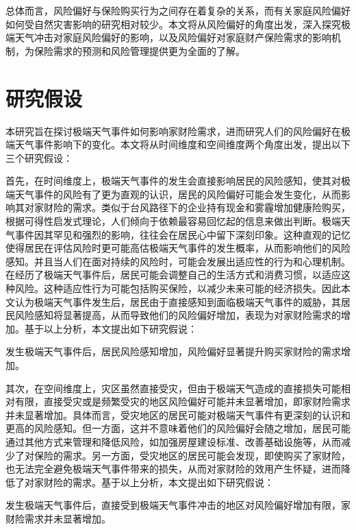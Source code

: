 总体而言，风险偏好与保险购买行为之间存在着复杂的关系，而有关家庭风险偏好如何受自然灾害影响的研究相对较少。本文将从风险偏好的角度出发，深入探究极端天气冲击对家庭风险偏好的影响，以及风险偏好对家庭财产保险需求的影响机制，为保险需求的预测和风险管理提供更为全面的了解。

\section{研究假设}

本研究旨在探讨极端天气事件如何影响家财险需求，进而研究人们的风险偏好在极端天气事件影响下的变化。本文将从时间维度和空间维度两个角度出发，提出以下三个研究假设：

首先，在时间维度上，极端天气事件的发生会直接影响居民的风险感知，使其对极端天气事件的风险有了更为直观的认识，居民的风险偏好可能会发生变化，从而影响其对家财险的需求。类似于台风路径下的企业持有现金\citep{0Do}和雾霾增加健康险购买\citep{赵强2021空气污染对商业健康保险需求的影响}，根据可得性启发式理论\citep{tversky1973availability}，人们倾向于依赖最容易回忆起的信息来做出判断。极端天气事件因其罕见和强烈的影响，往往会在居民心中留下深刻印象。这种直观的记忆使得居民在评估风险时更可能高估极端天气事件的发生概率，从而影响他们的风险感知。并且当人们在面对持续的风险时，可能会发展出适应性的行为和心理机制\citep{gigerenzer2011heuristic}。在经历了极端天气事件后，居民可能会调整自己的生活方式和消费习惯，以适应这种风险。这种适应性行为可能包括购买保险，以减少未来可能的经济损失。因此本文认为极端天气事件发生后，居民由于直接感知到面临极端天气事件的威胁，其居民风险感知将显著提高，从而导致他们的风险偏好增加，表现为对家财险需求的增加。基于以上分析，本文提出如下研究假说：

\begin{hyp} \label{hyp:1}
    发生极端天气事件后，居民风险感知增加，风险偏好显著提升购买家财险的需求增加。
\end{hyp}

其次，在空间维度上，灾区虽然直接受灾，但由于极端天气造成的直接损失可能相对有限，直接受灾或是频繁受灾的地区风险偏好可能并未显著增加\citep{shao2024typhoons}，即家财险需求并未显著增加。具体而言，受灾地区的居民可能对极端天气事件有更深刻的认识和更高的风险感知。但一方面，这并不意味着他们的风险偏好会随之增加，居民可能通过其他方式来管理和降低风险，如加强房屋建设标准、改善基础设施等，从而减少了对保险的需求。另一方面，受灾地区的居民可能会发现，即使购买了家财险，也无法完全避免极端天气事件带来的损失，从而对家财险的效用产生怀疑，进而降低了对家财险的需求。基于以上分析，本文提出如下研究假说：

\begin{hyp} \label{hyp:2}
    发生极端天气事件后，直接受到极端天气事件冲击的地区对风险偏好增加有限，家财险需求并未显著增加。
\end{hyp}

